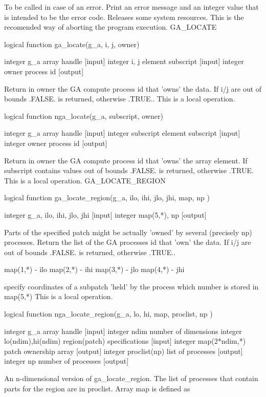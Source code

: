 To be called in case of an error. Print an error message and an integer
value that is intended to be the error code. Releases some system
resources. This is the recomended way of aborting the program execution.
GA\_LOCATE

logical function ga\_locate(g\_a, i, j, owner)

integer g\_a array handle {[}input{]} integer i, j element subscript
{[}input{]} integer owner process id {[}output{]}

Return in owner the GA compute process id that 'owns' the data. If
i/j are out of bounds .FALSE. is returned, otherwise .TRUE.. This
is a local operation.

logical function nga\_locate(g\_a, subscript, owner)

integer g\_a array handle {[}input{]} integer subscript element subscript
{[}input{]} integer owner process id {[}output{]}

Return in owner the GA compute process id that 'owns' the array element.
If subscript contains values out of bounds .FALSE. is returned, otherwise
.TRUE. This is a local operation. GA\_LOCATE\_REGION

logical function ga\_locate\_region(g\_a, ilo, ihi, jlo, jhi, map,
np )

integer g\_a, ilo, ihi, jlo, jhi {[}input{]} integer map(5,{*}), np
{[}output{]}

Parts of the specified patch might be actually 'owned' by several
(precisely np) processes. Return the list of the GA processes id that
'own' the data. If i/j are out of bounds .FALSE. is returned, otherwise
.TRUE..

map(1,{*}) - ilo map(2,{*}) - ihi map(3,{*}) - jlo map(4,{*}) - jhi

specify coordinates of a subpatch 'held' by the process which number
is stored in map(5,{*}) This is a local operation.

logical function nga\_locate\_region(g\_a, lo, hi, map, proclist,
np )

integer g\_a array handle {[}input{]} integer ndim number of dimensions
integer lo(ndim),hi(ndim) region(patch) specifications {[}input{]}
integer map(2{*}ndim,{*}) patch ownership array {[}output{]} integer
proclist(np) list of processes {[}output{]} integer np number of processes
{[}output{]}

An n-dimensional version of ga\_locate\_region. The list of processes
that contain parts for the region are in proclist. Array map is defined
as

